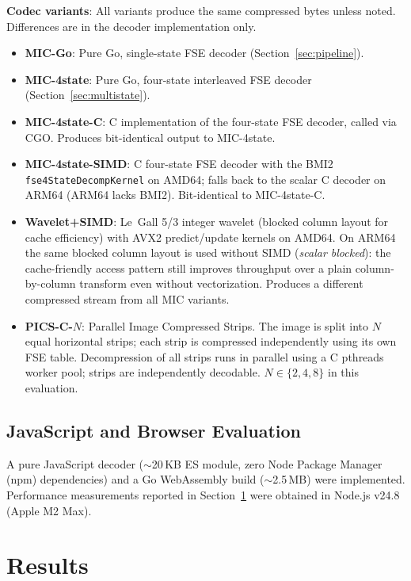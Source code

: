 \documentclass[journal]{IEEEtran}
\begin{document}
\textbf{Codec variants}: All variants produce the same compressed bytes unless
noted. Differences are in the decoder implementation only.
\begin{itemize}
  \item \textbf{MIC-Go}: Pure Go, single-state FSE decoder
  (Section~\ref{sec:pipeline}).
  \item \textbf{MIC-4state}: Pure Go, four-state interleaved FSE decoder
  (Section~\ref{sec:multistate}).
  \item \textbf{MIC-4state-C}: C implementation of the four-state FSE decoder,
  called via CGO. Produces bit-identical output to MIC-4state.
  \item \textbf{MIC-4state-SIMD}: C four-state FSE decoder with the BMI2
  \texttt{fse4StateDecompKernel} on AMD64; falls back to the scalar C decoder
  on ARM64 (ARM64 lacks BMI2). Bit-identical to MIC-4state-C.
  \item \textbf{Wavelet+SIMD}: Le~Gall 5/3 integer wavelet (blocked column
  layout for cache efficiency) with AVX2 predict/update kernels on AMD64. On
  ARM64 the same blocked column layout is used without SIMD (\emph{scalar
  blocked}): the cache-friendly access pattern still improves throughput over a
  plain column-by-column transform even without vectorization. Produces a
  different compressed stream from all MIC variants.
  \item \textbf{PICS-C-$N$}: Parallel Image Compressed Strips. The image is
  split into $N$ equal horizontal strips; each strip is compressed
  independently using its own FSE table. Decompression of all strips runs in
  parallel using a C pthreads worker pool; strips are independently decodable.
  $N \in \{2,4,8\}$ in this evaluation.
\end{itemize}


\subsection{JavaScript and Browser Evaluation}

A pure JavaScript decoder (${\sim}$20\,KB ES module, zero Node Package Manager
(npm) dependencies) and a Go WebAssembly build (${\sim}$2.5\,MB) were
implemented. Performance measurements reported in Section~\ref{sec:results}
were obtained in Node.js v24.8 (Apple M2 Max).

\section{Results}
\label{sec:results}
\end{document}
